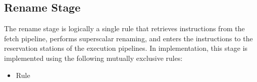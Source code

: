 \subsection{Rename Stage}

The rename stage is logically a single rule that retrieves instructions from the fetch pipeline, performs superscalar renaming, and enters the instructions to the reservation stations of the execution pipelines.
In implementation, this stage is implemented using the following mutually exclusive rules:
\begin{itemize}
    \item Rule 
\end{itemize}